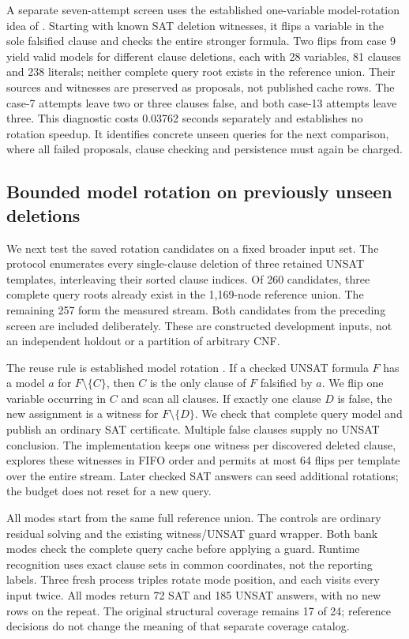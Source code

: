 \documentclass[11pt,a4paper]{article}
\numberwithin{equation}{section}
\theoremstyle{plain}
\theoremstyle{definition}
\theoremstyle{remark}
\begin{document}
A separate seven-attempt screen uses the established one-variable model-rotation
idea of \citet{belov2011rotation}. Starting with known SAT deletion witnesses,
it flips a variable in the sole falsified clause and checks the entire stronger
formula. Two flips from case 9 yield valid models for different clause deletions,
each with 28 variables, 81 clauses and 238 literals; neither complete query root
exists in the reference union. Their sources and witnesses are preserved as
proposals, not published cache rows. The case-7 attempts leave two or three
clauses false, and both case-13 attempts leave three. This diagnostic costs
0.03762 seconds separately and establishes no rotation speedup. It identifies
concrete unseen queries for the next comparison, where all failed proposals,
clause checking and persistence must again be charged.

\subsection{Bounded model rotation on previously unseen deletions}
\label{sec:bounded-model-rotation}

We next test the saved rotation candidates on a fixed broader input set.
The protocol enumerates every single-clause deletion of three retained UNSAT
templates, interleaving their sorted clause indices. Of 260 candidates, three
complete query roots already exist in the 1,169-node reference union. The
remaining 257 form the measured stream. Both candidates from the preceding
screen are included deliberately. These are constructed development inputs,
not an independent holdout or a partition of arbitrary CNF.

The reuse rule is established model rotation \citep{belov2011rotation}. If a
checked UNSAT formula $F$ has a model $a$ for $F\setminus\{C\}$, then $C$ is the
only clause of $F$ falsified by $a$. We flip one variable occurring in $C$ and
scan all clauses. If exactly one clause $D$ is false, the new assignment is a
witness for $F\setminus\{D\}$. We check that complete query model and publish an
ordinary SAT certificate. Multiple false clauses supply no UNSAT conclusion.
The implementation keeps one witness per discovered deleted clause, explores
these witnesses in FIFO order and permits at most 64 flips per template over
the entire stream. Later checked SAT answers can seed additional rotations;
the budget does not reset for a new query.

All modes start from the same full reference union. The controls are ordinary
residual solving and the existing witness/UNSAT guard wrapper. Both bank modes
check the complete query cache before applying a guard. Runtime recognition uses
exact clause sets in common coordinates, not the reporting labels. Three fresh
process triples rotate mode position, and each visits every input twice.
All modes return 72 SAT and 185 UNSAT answers, with no new rows on the repeat.
The original structural coverage remains 17 of 24; reference decisions do not
change the meaning of that separate coverage catalog.
\end{document}

